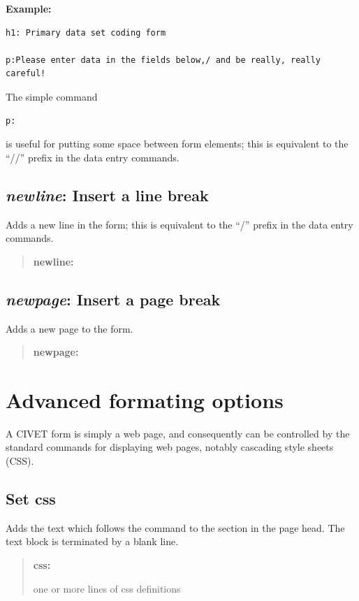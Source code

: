 \documentclass[letterpaper,10pt,english]{sphinxmanual}
\begin{document}
\textbf{Example:}

\begin{Verbatim}[commandchars=\\\{\}]
h1: Primary data set coding form

p:Please enter data in the fields below,/ and be really, really careful!
\end{Verbatim}

The simple command

\begin{Verbatim}[commandchars=\\\{\}]
p:
\end{Verbatim}

is useful for putting some space between form elements; this is equivalent to the
“//” prefix in the data entry commands.


\subsection{\emph{newline}: Insert a line break}
\label{forms:newline-insert-a-line-break}
Adds a new line in the form; this is equivalent to the “/” prefix in the
data entry commands.
\begin{quote}

\textbf{newline:}
\end{quote}


\subsection{\emph{newpage}: Insert a page break}
\label{forms:newpage-insert-a-page-break}
Adds a new page to the form.
\begin{quote}

\textbf{newpage:}
\end{quote}


\section{Advanced formating options}
\label{forms:advanced-formating-options}
A CIVET form is simply a web page, and consequently can be controlled by
the standard commands for displaying web pages, notably cascading style sheets (CSS).


\subsection{Set css}
\label{forms:set-css}
Adds the text which follows the command to the  section
in the page head. The text block is terminated by a blank line.
\begin{quote}

\begin{DUlineblock}{0em}
\item[] \textbf{css:}
\item[] one or more lines of css definitions
\end{DUlineblock}
\end{quote}
\end{document}
